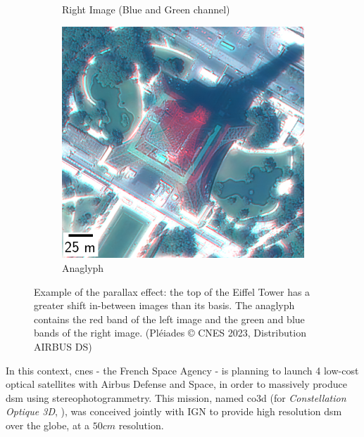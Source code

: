\begin{figure}
\begin{subfigure}[t]{0.32\linewidth}
        \caption{Right Image (Blue and Green channel)}
        \label{fig:eiffel_tower_right}
    \end{subfigure}\hfill
    \begin{subfigure}[t]{0.32\linewidth}
        \flushright
        \includegraphics[width=\linewidth]{Images/0_Intro/eiffel_tower_ana.png}
        \caption{Anaglyph}
        \label{fig:eiffel_tower_ana}
    \end{subfigure}
    \caption{Example of the parallax effect: the top of the Eiffel Tower has a greater shift in-between images than its basis. The anaglyph contains the red band of the left image and the green and blue bands of the right image. (Pléiades © CNES 2023, Distribution AIRBUS DS)}
    \label{fig:parallax}
\end{figure}


In this context, \acrshort{cnes} - the French Space Agency - is planning to launch 4 low-cost optical satellites with Airbus Defense and Space, in order to massively produce \acrshort{dsm} using stereophotogrammetry. This mission, named \acrshort{co3d} (for \textit{Constellation Optique 3D}, \cite{melet_co3d_2020}), was conceived jointly with IGN to provide high resolution \acrshort{dsm} over the globe, at a $50cm$ resolution.

